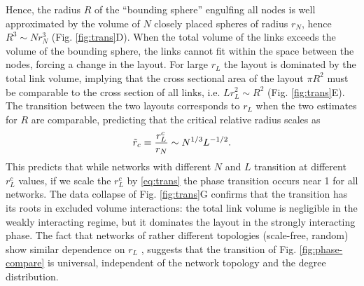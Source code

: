 \documentclass[linenumbers,endfloats,nofootinbib,preprint,floatfix,titlepage,superscriptaddress]{revtex4-1} %
\begin{document}
Hence, the radius $R$ of the ``bounding sphere'' engulfing all nodes is well approximated by the volume of $N$ closely placed spheres of radius $r_N$, hence $ R^3 \sim Nr_N^3 $ (Fig. \ref{fig:trans}D). 
When the total volume of the links exceeds the volume of the bounding sphere, the links cannot fit within the space between the nodes, forcing a change in the layout.  
For large $r_L$ the layout is dominated by the total link volume, implying that the cross sectional area of the layout $\pi R^2$ must be comparable to the cross section of all links, i.e. $ L r_L^2 \sim R^2$ (Fig. \ref{fig:trans}E). 
The transition between the two layouts corresponds to   $r_L$ when the two estimates for $R$ are comparable, predicting that the critical relative radius  scales as
\begin{equation}
    \tilde{r}_c \equiv {r^c_L\over r_N} \sim N^{1/3} L^{-1/2}. \label{eq:trans}
\end{equation}
This predicts that while networks with different $N$ and $L$ transition at different $r_L^c$ values, if we scale the $r_L^c$ by \eqref{eq:trans} the phase transition occurs near 1 for all networks.
The data collapse of Fig. \ref{fig:trans}G confirms that the transition has its roots in excluded volume interactions: the total link volume is negligible in the weakly interacting regime, but it dominates the layout in the strongly interacting phase.
The fact that networks of rather different topologies (scale-free, random) show similar dependence on $r_L$%
, suggests that the transition of Fig. \ref{fig:phase-compare} is universal, independent of the network topology and the degree distribution. 
\end{document}
